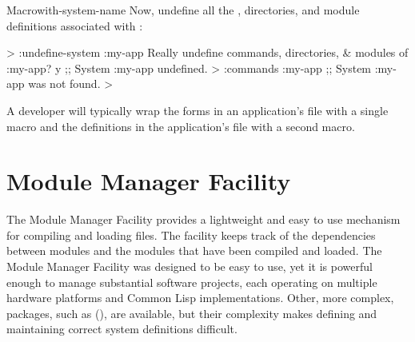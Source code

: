 \documentclass[10pt,twoside,english,pdftex]{article}
\begin{document}
\begin{functiondoc}{Macro}{with-system-name}{%
    }
Now, undefine all the , directories, and module definitions
associated with  : 
%
\W\supp
\begin{example}
  > :undefine-system :my-app
  Really undefine commands, directories, & modules of :my-app?  y
  ;; System :my-app undefined.
  > :commands :my-app
  ;; System :my-app was not found.
  >
\end{example}

\fnnotes A developer will typically wrap the
 forms in an application's
 file with a single
 macro and the definitions in the
application's  file with a second
 macro.

\end{functiondoc}


\T\markright{}%
\T\pagestyle{plain}
\T\cleardoublepage
\W{}
\T\pagestyle{fancy}
\T\thispagestyle{fancybottom}
\T\global\def\fnlastname{ }%
\T\renewcommand{\headrulewidth}{0pt}
\section{Module Manager Facility}
\label{sec:module-manager}%

%
%
%
%
%
%
%
%
%
%
The Module Manager Facility provides a lightweight and easy to use mechanism
for compiling and loading  files.  The facility keeps track of
the dependencies between modules and the modules that have been compiled and
loaded. The Module Manager Facility was designed to be easy to use, yet it is
powerful enough to manage substantial software projects, each operating on
multiple hardware platforms and Common Lisp implementations.  Other, more
complex,  packages, such as
(), are available,
  but their complexity makes defining and maintaining correct system
  definitions difficult.
\end{document}
